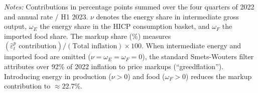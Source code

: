 \begin{table}[H]
\par\smallskip
\footnotesize\raggedright 
\textit{Notes:} Contributions in percentage points summed over the four quarters of 2022 and annual rate / H1 2023. $\nu$ denotes the energy share in intermediate gross output, $\omega_E$ the energy share in the HICP consumption basket, and $\omega_F$ the imported food share. The markup share (\%) measures $(\hat{\varepsilon}_t^p\text{ contribution}) / (\text{Total inflation}) \times 100$. When intermediate energy and imported food are omitted ($\nu = \omega_E = \omega_F = 0$), the standard Smets-Wouters filter attributes over 92\% of 2022 inflation to price markups (``greedflation''). Introducing energy in production ($\nu > 0$) and food ($\omega_F > 0$) reduces the markup contribution to $\approx 22.7\%$.
\end{table}
